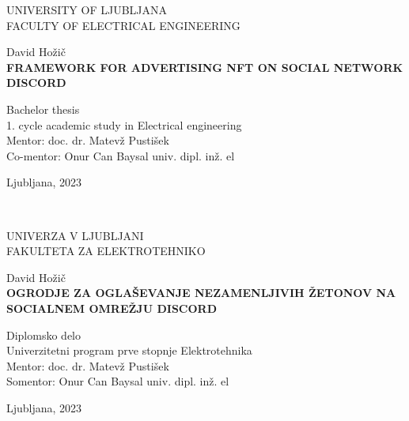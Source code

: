 \begin{titlepage}
    \thispagestyle{empty} 

        \begin{center}
        {\large 
        UNIVERSITY OF LJUBLJANA\\
        FACULTY OF ELECTRICAL ENGINEERING\\
        }

        \vspace{3cm}
        {\LARGE David Hožič}\\

        \vspace{2cm}
        {\textbf{\LARGE 
        FRAMEWORK FOR ADVERTISING NFT ON SOCIAL NETWORK DISCORD\\ 
        }}

        \vspace{2cm}
        {\Large Bachelor thesis}\\
        
        \vspace{1cm}
        {\Large 1. cycle academic study in Electrical engineering}\\

        \vspace{2cm}
        {\Large Mentor: doc. dr. Matevž Pustišek}\\
        {\Large Co-mentor: Onur Can Baysal univ. dipl. inž. el}

        \vfill
        {\Large Ljubljana, 2023}
        \end{center}
        \ \thispagestyle{empty}

    \newpage
    \thispagestyle{empty} 
    \begin{center}
    {\large 
    UNIVERZA V LJUBLJANI\\
    FAKULTETA ZA ELEKTROTEHNIKO\\
    }

    \vspace{3cm}
    {\LARGE David Hožič}\\

    \vspace{2cm}
    {\textbf{\LARGE 
    OGRODJE ZA OGLAŠEVANJE NEZAMENLJIVIH ŽETONOV
    NA SOCIALNEM OMREŽJU DISCORD\\ 
    }}

    \vspace{2cm}
    {\Large Diplomsko delo}\\
    
    \vspace{1cm}
    {\Large Univerzitetni program prve stopnje Elektrotehnika}\\

    \vspace{2cm}
    {\Large Mentor: doc. dr. Matevž Pustišek}\\
    {\Large Somentor: Onur Can Baysal univ. dipl. inž. el}

    \vfill
    {\Large Ljubljana, 2023}
    \end{center}
    \ \thispagestyle{empty}

\end{titlepage}

\blankpage

